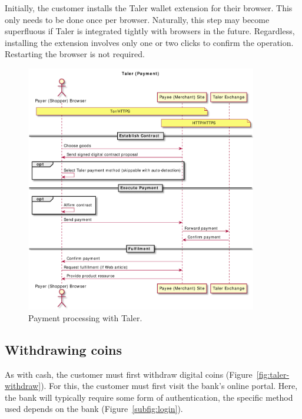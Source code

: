 \documentclass{llncs}
\begin{document}
Initially, the customer installs the Taler wallet extension for
their browser.  This only needs to be done once per
browser. Naturally, this step may become superfluous if Taler is
integrated tightly with browsers in the future.  Regardless,
installing the extension involves only one or two clicks to confirm the
operation. Restarting the browser is not required.


\begin{figure}[b!]
\includegraphics[width=0.9\textwidth]{figs/taler-pay.pdf}
\caption{Payment processing with Taler.}
\label{fig:taler-pay}
\end{figure}


\subsection{Withdrawing coins}

As with cash, the customer must first withdraw digital coins
(Figure~\ref{fig:taler-withdraw}).  For this, the customer must first
visit the bank's online portal.  Here, the bank will
typically require some form of authentication, the specific method
used depends on the bank (Figure~\ref{subfig:login}).
\end{document}
